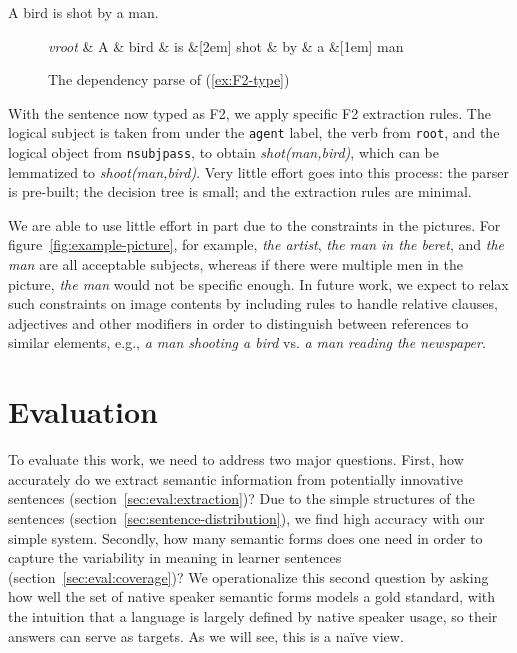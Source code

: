 \begin{exe}
  \ex\label{ex:F2-type}A bird is shot by a man.
\end{exe}

\begin{figure}[htb!]
\begin{center}
    \begin{dependency}[arc edge,text only label,label style={above}]
    \begin{deptext}[column sep=.5em]
      \textit{vroot} \& A \& bird \& is \&[2em] shot \& by \& a \&[1em] man \\
    \end{deptext}
  \end{dependency}
\end{center}
\caption{The dependency parse of (\ref{ex:F2-type})}
\label{fig:F2-dependency}
\end{figure}

With the sentence now typed as F2, we apply specific F2 extraction
rules. The logical subject is taken from under the {\tt agent} label,
the verb from {\tt root}, and the logical object from {\tt nsubjpass},
to obtain \textit{shot(man,bird)}, which can be lemmatized to
\textit{shoot(man,bird)}.  Very little effort goes into this process:
the parser is pre-built; the decision tree is small; and the
extraction rules are minimal.

We are able to use little effort in part due to the constraints in the
pictures.  For figure~\ref{fig:example-picture}, for example,
\textit{the artist}, \textit{the man in the beret}, and \textit{the
  man} are all acceptable subjects, whereas if there were multiple men
in the picture, \textit{the man} would not be specific enough.
In future work, we expect to relax such constraints on image contents
by including rules to handle relative clauses, adjectives and other
modifiers in order to distinguish between references to similar
elements, e.g., 
\textit{a man shooting a bird} vs. \textit{a man reading the
  newspaper}.

\section{Evaluation}
\label{sec:evaluation}

To evaluate this work, we need to address two major questions.  First,
how accurately do we extract semantic information from potentially
innovative sentences (section~\ref{sec:eval:extraction})?  Due to the
simple structures of the sentences
(section~\ref{sec:sentence-distribution}), we find high accuracy with
our simple system.  Secondly, how many semantic forms does one need in
order to capture the variability in meaning in learner sentences
(section~\ref{sec:eval:coverage})?  We operationalize this second
question by asking how well the set of native speaker semantic forms
models a gold standard, with the intuition that a language is largely defined
by native speaker usage, so their answers can serve as targets.  As we
will see, this is a na\"ive view.

